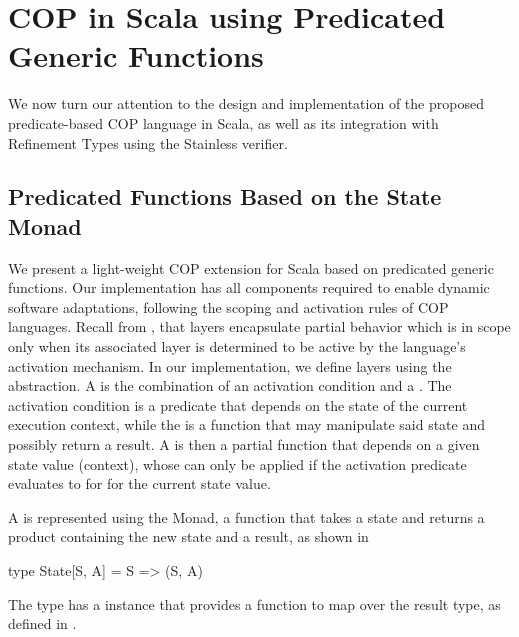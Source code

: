 

\section{\ac{COP} in Scala using Predicated Generic Functions}
\label{sec:context-scala}

We now turn our attention to the design and implementation of the proposed predicate-based 
\ac{COP} language in Scala, as well as its integration with Refinement Types using the Stainless 
verifier.


\subsection{Predicated Functions Based on the State Monad}
\label{sec:predicaote-monad}

We present a light-weight \ac{COP} extension for Scala based on predicated generic functions. Our 
implementation has all components required to enable dynamic software adaptations, following the 
scoping and activation rules of \ac{COP} languages. Recall from , that layers encapsulate 
partial behavior which is in scope only when its associated layer is determined to be active by
the language's activation mechanism. In our implementation, we define layers using the 
 abstraction. A  is the combination of an 
activation condition and a . The activation condition is a predicate that depends on 
the state of the current execution context, while the  is a function that may manipulate 
said state and possibly return a result. A  is then a partial function that 
depends on a given state value (\ie context), whose  can only be applied if the 
activation predicate evaluates to  for for the current state value.

A  is represented using the  Monad, a function that takes a state and 
returns a product containing the new state and a result, as shown in 

\begin{scala}[label=lst:state-type, caption=Simplified definition of the State monad]
  type State[S, A] = S => (S, A)
\end{scala}

The  type has a  instance that provides a function to map over the result type, as defined in .

